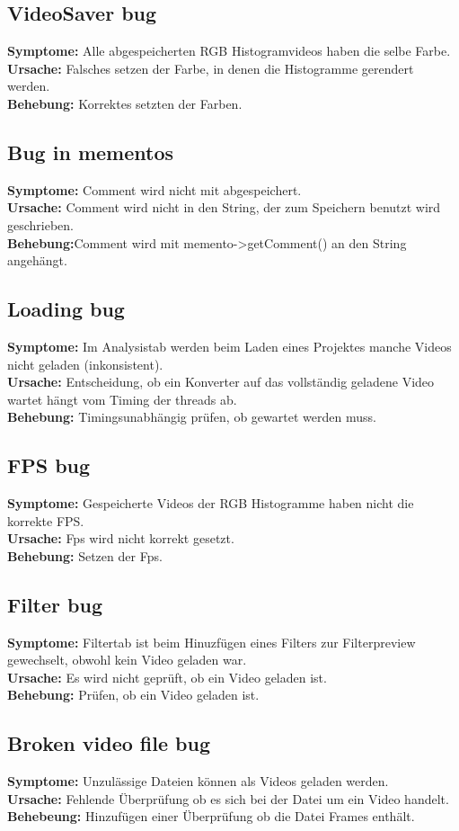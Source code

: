 \documentclass{scrartcl}
\begin{document}
{\subsection{VideoSaver bug}
\textbf{Symptome:}
Alle abgespeicherten RGB Histogramvideos haben die selbe Farbe.\\
\textbf{Ursache:}
Falsches setzen der Farbe, in denen die Histogramme gerendert werden.\\
\textbf{Behebung:}
Korrektes setzten der Farben.
\subsection{Bug in mementos}
\textbf{Symptome:} Comment wird nicht mit abgespeichert.\\
\textbf{Ursache:} Comment wird nicht in den String, der zum Speichern benutzt wird geschrieben.\\
\textbf{Behebung:}Comment wird mit memento->getComment() an den String angehängt.
\subsection{Loading bug}
\textbf{Symptome:}
Im Analysistab werden beim Laden eines Projektes manche Videos nicht geladen (inkonsistent).\\
\textbf{Ursache:}
Entscheidung, ob ein Konverter auf das vollständig geladene Video wartet hängt vom Timing der threads ab.\\
\textbf{Behebung:}
Timingsunabhängig prüfen, ob gewartet werden muss.
\subsection{FPS bug}
\textbf{Symptome:}
Gespeicherte Videos der RGB Histogramme haben nicht die korrekte FPS.\\
\textbf{Ursache:}
Fps wird nicht korrekt gesetzt.\\
\textbf{Behebung:}
Setzen der Fps.
\subsection{Filter bug}
\textbf{Symptome:}
Filtertab ist beim Hinuzfügen eines Filters zur Filterpreview gewechselt, obwohl kein Video geladen war.\\
\textbf{Ursache:}
Es wird nicht geprüft, ob ein Video geladen ist.\\
\textbf{Behebung:}
Prüfen, ob ein Video geladen ist.
\subsection{Broken video file bug}
\textbf{Symptome:} Unzulässige Dateien können als Videos geladen werden.\\
\textbf{Ursache:} Fehlende Überprüfung ob es sich bei der Datei um ein Video handelt.\\
\textbf{Behebeung:} Hinzufügen einer Überprüfung ob die Datei Frames enthält.
}
\end{document}
